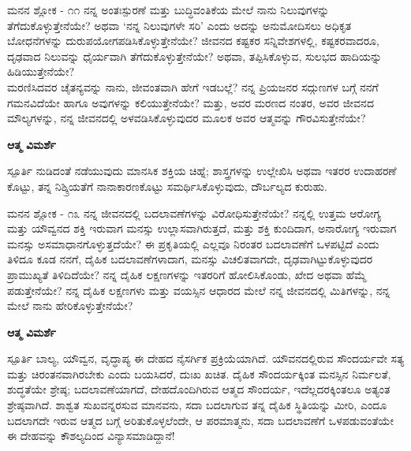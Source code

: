 \newpage
\begin{mananam}{\mananamfont \large \large ಮನನ ಶ್ಲೋಕ - ೧೧}
\footnotesize \mananamtext ನನ್ನ ಅಂತಃಸ್ಪುರಣೆ ಮತ್ತು ಬುದ್ಧಿವಂತಿಕೆಯ ಮೇಲೆ ನಾನು ನಿಲುವುಗಳನ್ನು ತೆಗೆದುಕೊಳ್ಳುತ್ತೇನೆಯೇ? ಅಥವಾ ‘ನನ್ನ ನಿಲುವುಗಳೇ ಸರಿ’ ಎಂದು ಅದನ್ನು ಅನುಮೋದಿಸಲು ಅಧಿಕೃತ ಬೋಧನೆಗಳನ್ನು ದುರುಪಯೋಗಪಡಿಸಿಕೊಳ್ಳುತ್ತೇನೆಯೇ? ಜೀವನದ ಕಷ್ಟಕರ ಸನ್ನಿವೇಶಗಳಲ್ಲಿ, ಕಷ್ಟಕರವಾದರೂ, ದೃಢವಾದ ನಿಲುವನ್ನು ಧೈರ್ಯವಾಗಿ ತೆಗೆದುಕೊಳ್ಳುತ್ತೇನೆಯೇ? ಅಥವಾ, ತಪ್ಪಿಸಿಕೊಳ್ಳುವ, ಸುಲಭದ ಹಾದಿಯನ್ನು ಹಿಡಿಯುತ್ತೇನೆಯೇ?\\
ಮರಣಿಸಿದವರ ಚೈತನ್ಯವನ್ನು ನಾನು, ಜೀವಂತವಾಗಿ ಹೇಗೆ ಇಡಬಲ್ಲೆ? ನನ್ನ ಪ್ರಿಯಜನರ ಸದ್ಗುಣಗಳ ಬಗ್ಗೆ ನನಗೆ ಗಮನವಿದೆಯೇ ಹಾಗೂ ಅವುಗಳನ್ನು ಕಲಿಯುತ್ತೇನೆಯೇ? ಮತ್ತು, ಅವರ ಮರಣದ ನಂತರ, ಅವರ ಜೀವನದ ಮೌಲ್ಯಗಳನ್ನು, ನನ್ನ ಜೀವನದಲ್ಲಿ ಅಳವಡಿಸಿಕೊಳ್ಳುವುದರ ಮೂಲಕ ಅವರ ಆತ್ಮವನ್ನು ಗೌರವಿಸುತ್ತೇನೆಯೇ?
\end{mananam}
\WritingHand\enspace\textbf{ಆತ್ಮ ವಿಮರ್ಶೆ}
\begin{inspiration}{\mananamfont \large \large ಸ್ಪೂರ್ತಿ}
\footnotesize \mananamtext ನುಡಿದಂತೆ ನಡೆಯುವುದು ಮಾನಸಿಕ ಶಕ್ತಿಯ ಚಿಹ್ನೆ; ಶಾಸ್ತ್ರಗಳನ್ನು ಉಲ್ಲೇಖಿಸಿ ಅಥವಾ ಇತರರ ಉದಾಹರಣೆ ಕೊಟ್ಟು, ತನ್ನ ನಿಶ್ಕ್ರಿಯತೆಗೆ ನಾನಾಕಾರಣಕೊಟ್ಟು ಸಮರ್ಥಿಸಿಕೊಳ್ಳುವುದು, ದೌರ್ಬಲ್ಯದ ಕುರುಹು.
\end{inspiration}
\newpage

\begin{mananam}{\mananamfont \large \large ಮನನ ಶ್ಲೋಕ - ೧೩}
\footnotesize \mananamtext ನನ್ನ ಜೀವನದಲ್ಲಿ ಬದಲಾವಣೆಗಳನ್ನು ವಿರೋಧಿಸುತ್ತೇನೆಯೇ? ನನ್ನಲ್ಲಿ ಉತ್ತಮ ಆರೋಗ್ಯ ಮತ್ತು ಯೌವ್ವನದ ಶಕ್ತಿ ಇರುವಾಗ ಮನಸ್ಸು ಉಲ್ಲಾಸವಾಗಿರುತ್ತದೆ, ಮತ್ತು ಶಕ್ತಿ ಕುಂದಿದಾಗ, ಅನಾರೋಗ್ಯ ಇರುವಾಗ ಮನಸ್ಸು ಅಸಮಾಧಾನಗೊಳ್ಳುತ್ತದೆಯೇ? ಈ ಪ್ರಕೃತಿಯಲ್ಲಿ ಎಲ್ಲವೂ ನಿರಂತರ ಬದಲಾವಣೆಗೆ ಒಳಪಟ್ಟಿದೆ ಎಂದು ತಿಳಿದೂ ಕೂಡ ನನಗೆ, ದೈಹಿಕ ಬದಲಾವಣೆಗಳಾದಾಗ, ಮನಸ್ಸು ವಿಚಲಿತವಾಗದೇ, ದೃಢವಾಗಿಟ್ಟುಕೊಳ್ಳುವುದರ ಪ್ರಾಮುಖ್ಯತೆ ತಿಳಿದಿದೆಯೇ? ನನ್ನ ದೈಹಿಕ ಲಕ್ಷಣಗಳನ್ನು ಇತರರಿಗೆ ಹೋಲಿಸಿಕೊಂಡು, ಖೇದ ಅಥವಾ ಹೆಮ್ಮೆ ಪಡುತ್ತೇನೆಯೇ? ನನ್ನ ದೈಹಿಕ ಲಕ್ಷಣಗಳು ಮತ್ತು ವಯಸ್ಸಿನ ಆಧಾರದ ಮೇಲೆ ನನ್ನ ಜೀವನದಲ್ಲಿ ಮಿತಿಗಳನ್ನು, ನನ್ನ ಮೇಲೆ ನಾನು ಹೇರಿಕೊಳ್ಳುತ್ತೇನೆಯೇ?
\end{mananam}
\WritingHand\enspace\textbf{ಆತ್ಮ ವಿಮರ್ಶೆ}
\begin{inspiration}{\mananamfont \large \large ಸ್ಪೂರ್ತಿ}
\footnotesize \mananamtext ಬಾಲ್ಯ, ಯೌವ್ವನ, ವೃದ್ಧಾಪ್ಯ ಈ ದೇಹದ ನೈಸರ್ಗಿಕ ಪ್ರಕ್ರಿಯೆಯಾಗಿದೆ. ಯೌವನದಲ್ಲಿರುವ ಸೌಂದರ್ಯವೇ ಸತ್ಯ ಮತ್ತು ಚಿರಂತನವಾಗಿರಬೇಕು ಎಂದು ಬಯಸಿದರೆ, ದುಃಖ ಖಚಿತ. ದೈಹಿಕ ಸೌಂದರ್ಯಕ್ಕಿಂತ ಮನಸ್ಸಿನ ನಿರ್ಮಲತೆ, ಶುದ್ಧತೆಯೇ ಶ್ರೇಷ್ಠ; ಬದಲಾವಣೆಯಾಗದೆ, ದೇಹದೊಂದಿಗಿರುವ ಆತ್ಮದ ಸೌಂದರ್ಯ, ಇದೆಲ್ಲದರಕ್ಕಿಂತಲೂ  ಅತ್ಯಂತ ಶ್ರೇಷ್ಠವಾಗಿದೆ.
 ಶಾಶ್ವತ ಸುಖವನ್ನರಸುವ ಮಾನವನು,  ಸದಾ ಬದಲಾಗುವ ತನ್ನ ದೈಹಿಕ ಸ್ಥಿತಿಯನ್ನು ಮೀರಿ, ಎಂದೂ ಬದಲಾಗದೇ ಇರುವ ಆತ್ಮದ ಬಗ್ಗೆ ಅರಿತುಕೊಳ್ಳಲೆಂದೇ, ಆ ಪರಮಾತ್ಮನು,  ಸದಾ ಬದಲಾವಣೆಗೆ ಒಳಪಡುವಂತೆಯೇ ಈ ದೇಹವನ್ನು ಕೌಶಲ್ಯದಿಂದ ವಿನ್ಯಾಸಮಾಡಿದ್ದಾನೆ!
\end{inspiration}
\newpage

